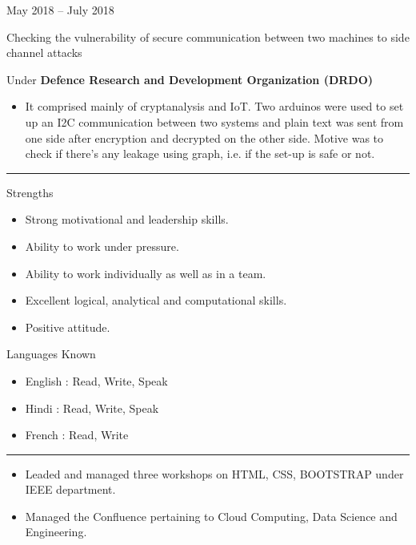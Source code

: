 \documentclass[a4paper,10pt]{article}
\newlength{\cvcolumngapwidth}
\newlength{\cvleftcolumnwidth}
\newlength{\cvrightcolumnwidth}
\newcommand{\cvsectionstyle}[1]{{\normalsize\cvsectionfont\textcolor{cvsectioncolor}{#1}}}
\newcommand{\cvtitlestyle}[1]{{\large\cvtitlefont\textcolor{cvtitlecolor}{#1}}}
\newcommand{\cvdurationstyle}[1]{{\small\cvdurationfont\textcolor{cvdurationcolor}{#1}}}
\newcommand{\cvheadingstyle}[1]{{\normalsize\cvheadingfont\textcolor{cvheadingcolor}{#1}}}
\newlength{\cvafteritemskipamount}
\newlength{\cvaftersectionskipamount}
\newlength{\cvbetweensectionandheadingextraskipamount}
\newlength{\cvaftertitleskipamount}
\newlength{\cvparskip}
\newcommand{\cvsection}[1]{
    \begin{minipage}[t]{\cvleftcolumnwidth}
        \raggedleft\cvsectionstyle{#1}
    \end{minipage}%
    \hspace{\cvcolumngapwidth}%
    \begin{minipage}[t]{\cvrightcolumnwidth}
        \textcolor{cvrulecolor}{\rule{\cvrightcolumnwidth}{0.3mm}}
    \end{minipage}

    \vspace{\cvaftersectionskipamount}
}
\newcommand{\cvitem}[2]{
    \begin{minipage}[t]{\cvleftcolumnwidth}
        \raggedleft #1
    \end{minipage}%
    \hspace{\cvcolumngapwidth}%
    \begin{minipage}[t]{\cvrightcolumnwidth}
        \setlength{\parskip}{\cvparskip} #2
    \end{minipage}

    \vspace{\cvafteritemskipamount}
}
\newcommand{\cvtitle}[1]{
    \cvtitlestyle{#1}

    \vspace{\cvaftertitleskipamount}
    \vspace{-\cvparskip}
}
\begin{document}
\cvitem{
    \cvdurationstyle{May 2018 -- July 2018}
}{
    \cvtitle{Checking the vulnerability of secure communication between two machines to side channel attacks}
    Under \textbf{Defence Research and Development Organization (DRDO)}
    \begin{itemize}[leftmargin=*]
        \item It comprised mainly of cryptanalysis and IoT. Two arduinos were used to set up an I2C communication between two systems and plain text was sent from one side after encryption and decrypted on the other side. Motive was to check if there’s any leakage using graph, i.e. if the set-up is safe or not.
        
    \end{itemize}
}


\cvsection{Personal skills}

\vspace{\cvbetweensectionandheadingextraskipamount}

\cvitem{
    \cvheadingstyle{Strengths}
}{
    
    \begin{itemize}
        \item Strong motivational and leadership skills.
        \item Ability to work under pressure.
        \item Ability to work individually as well as in a team.
        \item Excellent logical, analytical and computational skills.
        \item Positive attitude.
    \end{itemize}

    
}


\cvitem{
    \cvheadingstyle{Languages Known}
}{
    
    \begin{itemize}
        \item English : Read, Write, Speak
         \item Hindi : Read, Write, Speak
          \item French : Read, Write
    \end{itemize}


}

\cvsection{Extra Curricular activities}

\vspace{\cvbetweensectionandheadingextraskipamount}

\cvitem{
    \cvheadingstyle{}
}{
    
    \begin{itemize}
        \item Leaded and managed three workshops on HTML, CSS, BOOTSTRAP under IEEE department.
        \item Managed the Confluence pertaining to Cloud Computing, Data Science and Engineering.
       
    \end{itemize}

    
}
\end{document}

